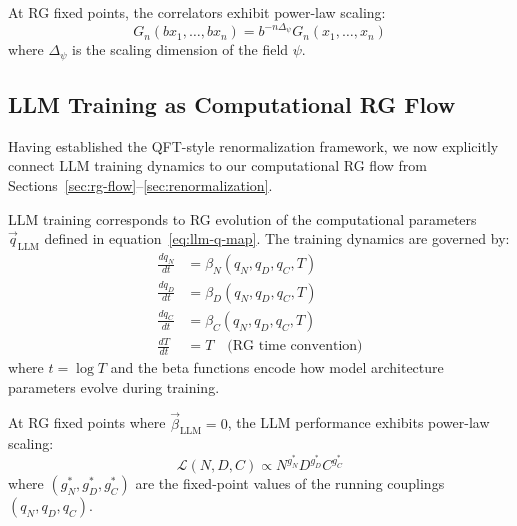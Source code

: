 \begin{proposition}
\label{prop:fixed_points_scaling}
At RG fixed points, the correlators exhibit power-law scaling:
\begin{equation}
  G_n(bx_1,\ldots,bx_n) = b^{-n \Delta_\psi} G_n(x_1,\ldots,x_n)
  \label{eq:scaling_correlators}
\end{equation}
where $\Delta_\psi$ is the scaling dimension of the field $\psi$.
\end{proposition}

\subsection{LLM Training as Computational RG Flow}
\label{sec:llm-rg-connection}

Having established the QFT-style renormalization framework, we now explicitly connect LLM training dynamics to our computational RG flow from Sections~\ref{sec:rg-flow}--\ref{sec:renormalization}.

\begin{definition}
\label{def:llm-training-rg}
LLM training corresponds to RG evolution of the computational parameters $\vec{q}_{\text{LLM}}$ defined in equation~\eqref{eq:llm-q-map}. The training dynamics are governed by:
\begin{align}
\frac{dq_N}{dt} &= \beta_N(q_N, q_D, q_C, T) \label{eq:beta-N} \\
\frac{dq_D}{dt} &= \beta_D(q_N, q_D, q_C, T) \label{eq:beta-D} \\
\frac{dq_C}{dt} &= \beta_C(q_N, q_D, q_C, T) \label{eq:beta-C} \\
\frac{dT}{dt} &= T \quad \text{(RG time convention)} \label{eq:beta-T}
\end{align}
where $t = \log T$ and the beta functions encode how model architecture parameters evolve during training.
\end{definition}

\begin{theorem}
\label{thm:llm-scaling-laws}
At RG fixed points where $\vec{\beta}_{\text{LLM}} = 0$, the LLM performance exhibits power-law scaling:
\begin{equation}
\mathcal{L}(N, D, C) \propto N^{g_N^*} D^{g_D^*} C^{g_C^*} \label{eq:llm-scaling-law}
\end{equation}
where $(g_N^*, g_D^*, g_C^*)$ are the fixed-point values of the running couplings $(q_N, q_D, q_C)$.
\end{theorem}

